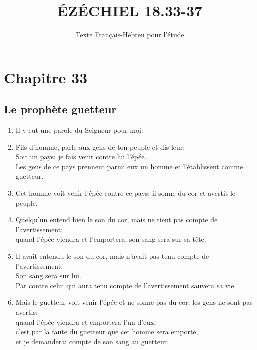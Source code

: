 \documentclass[12pt,a4paper,titlepage]{article}
\title{\vspace{5cm} \huge ÉZÉCHIEL 18.33-37}
\date{Texte Français-Hébreu pour l'étude}
\def \pslabelsep{0.2em} %
\def \psleftmargin{0em} %
\begin{document}
\maketitle
\vfill

\newpage 

\noindent
\section*{Chapitre 33}
\subsection*{Le prophète guetteur}
\begin{enumerate}[leftmargin=\psleftmargin, labelsep = \pslabelsep, label={\arabic*}, font=\color{\pscolor}\small\textsuperscript, parsep=0em, itemsep=0em, topsep=0em ]
\item Il y eut une parole du Seigneur pour moi:
\item Fils d’homme, parle aux gens de ton peuple et dis-leur: \\ Soit un pays: je fais venir contre lui l’épée.\\ Les gens de ce pays prennent parmi eux un homme et l’établissent comme guetteur.
\item Cet homme voit venir l’épée contre ce pays; il sonne du cor et avertit le peuple.
\item Quelqu’un entend bien le son du cor, mais ne tient pas compte de l’avertissement: \\ quand l’épée viendra et l’emportera, son sang sera sur sa tête. 
\item Il avait entendu le son du cor, mais n’avait pas tenu compte de l’avertissement. \\ Son sang sera sur lui. \\ Par contre celui qui aura tenu compte de l’avertissement sauvera sa vie. 
\item Mais le guetteur voit venir l’épée et ne sonne pas du cor: les gens ne sont pas avertis; \\ quand l’épée viendra et emportera l’un d’eux, \\ c’est par la faute du guetteur que cet homme sera emporté, 
\\ et je demanderai compte de son sang au guetteur. \parSpace


\end{enumerate}
\end{document}
